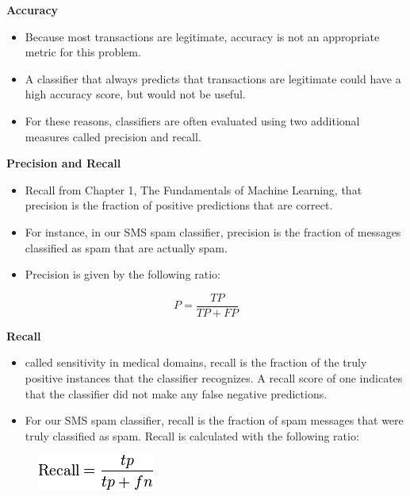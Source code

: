 \documentclass[PredictiveAnalytics101.tex]{subfiles}
\begin{document}
\begin{frame}
\textbf{Accuracy}\\
\begin{itemize}
\item Because most transactions are legitimate, accuracy is
not an appropriate metric for this problem.
\item  A classifier that always predicts that
transactions are legitimate could have a high accuracy score, but would not be
useful. 
\item For these reasons, classifiers are often evaluated using two additional
measures called precision and recall.
\end{itemize}

\end{frame}
\begin{frame}
\textbf{Precision and Recall}

\begin{itemize}
\item Recall from Chapter 1, The Fundamentals of Machine Learning, that precision is the
fraction of positive predictions that are correct. 
\item For instance, in our SMS spam
classifier, precision is the fraction of messages classified as spam that are actually
spam. 
\item Precision is given by the following ratio:
\end{itemize}

\[ P = \frac{TP}{TP + FP} \]
\end{frame}
\begin{frame}
	\textbf{Recall}
\begin{itemize}
\item  called sensitivity in medical domains, recall is the fraction of the truly
positive instances that the classifier recognizes. A recall score of one indicates
that the classifier did not make any false negative predictions. 

\item For our SMS spam
classifier, recall is the fraction of spam messages that were truly classified as spam.
Recall is calculated with the following ratio:
\end{itemize}

\begin{figure}
\centering
\includegraphics[width=0.7\linewidth]{recall}

\end{figure}

\end{frame}
\end{document}
